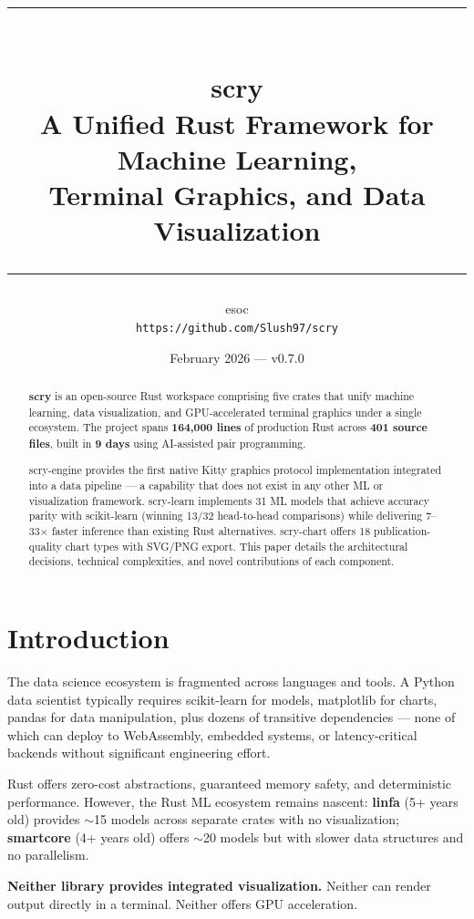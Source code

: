 \documentclass[11pt,a4paper]{article}
\title{
    \vspace{-1cm}
    \rule{\textwidth}{2pt}\\[0.3em]
    {\Huge\bfseries scry}\\[0.3em]
    {\Large A Unified Rust Framework for Machine Learning,\\
    Terminal Graphics, and Data Visualization}\\[0.5em]
    \rule{\textwidth}{0.5pt}
}
\author{
    {\large esoc} \\[0.3em]
    \texttt{https://github.com/Slush97/scry}
}
\date{February 2026 --- v0.7.0}
\begin{document}
\maketitle
\thispagestyle{fancy}

\begin{abstract}
\noindent
\textbf{scry} is an open-source Rust workspace comprising five crates
that unify machine learning, data visualization, and GPU-accelerated
terminal graphics under a single ecosystem. The project spans
\textbf{164,000 lines} of production Rust across \textbf{401 source
files}, built in \textbf{9 days} using AI-assisted pair programming.

scry-engine provides the first native Kitty graphics protocol
implementation integrated into a data pipeline --- a capability that
does not exist in any other ML or visualization framework.
scry-learn implements 31 ML models that achieve accuracy parity with
scikit-learn (winning 13/32 head-to-head comparisons) while delivering
7--33$\times$ faster inference than existing Rust alternatives.
scry-chart offers 18 publication-quality chart types with SVG/PNG
export. This paper details the architectural decisions, technical
complexities, and novel contributions of each component.
\end{abstract}

\section{Introduction}

The data science ecosystem is fragmented across languages and tools.
A Python data scientist typically requires scikit-learn for models,
matplotlib for charts, pandas for data manipulation, plus dozens of
transitive dependencies --- none of which can deploy to WebAssembly,
embedded systems, or latency-critical backends without significant
engineering effort.

Rust offers zero-cost abstractions, guaranteed memory safety, and
deterministic performance. However, the Rust ML ecosystem remains
nascent: \textbf{linfa} (5+ years old) provides $\sim$15 models across
separate crates with no visualization; \textbf{smartcore} (4+ years old)
offers $\sim$20 models but with slower data structures and no
parallelism.

\textbf{Neither library provides integrated visualization.} Neither can
render output directly in a terminal. Neither offers GPU acceleration.
\end{document}
